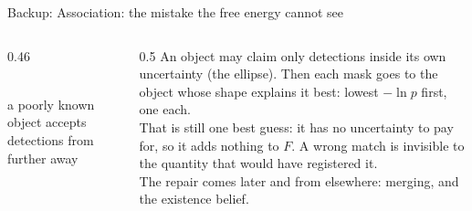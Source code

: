 \documentclass[10pt, aspectratio=169]{beamer}
\begin{document}
\begin{frame}{Backup: Association: the mistake the free energy cannot see}
  \begin{columns}[c]
    \begin{column}{0.46\textwidth}
      \centering
      \\[0.4em]
      {\small a poorly known object accepts detections from further away}
    \end{column}
    \begin{column}{0.5\textwidth}
      \small
      An object may claim only detections inside its own uncertainty (the ellipse). Then each mask goes
      to the object whose shape explains it best: lowest $-\ln p$ first, one each.\\[0.5em]
      That is still one best guess: it has no uncertainty to pay for, so it adds nothing to $F$.
      \alert{A wrong match is invisible to the quantity that would have registered it.}\\[0.5em]
      The repair comes later and from elsewhere: merging, and the existence belief.
    \end{column}
  \end{columns}
\end{frame}
\end{document}
